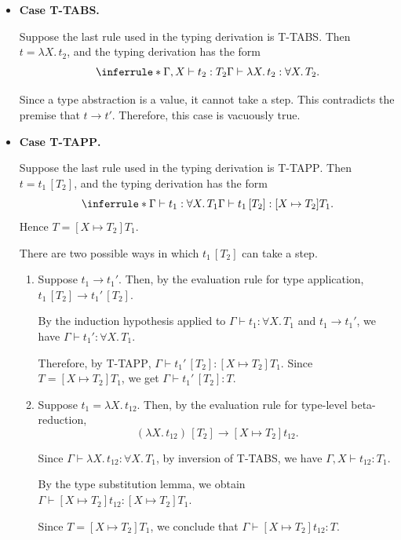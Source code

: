\documentclass[nonacm]{acmart}
\begin{document}
\begin{itemize}
    \item \textbf{Case \textsc{T-TABS}.}

    Suppose the last rule used in the typing derivation is \textsc{T-TABS}. Then $t = \lambda X.\,t_2$, and the typing derivation has the form
    \[
    \inferrule*
    {
      \Gamma, X \vdash t_2 : T_2
    }
    {
      \Gamma \vdash \lambda X.\,t_2 : \forall X.\,T_2
    }.
    \]

    Since a type abstraction is a value, it cannot take a step. This contradicts the premise that $t \longrightarrow t'$. Therefore, this case is vacuously true.

    \item \textbf{Case \textsc{T-TAPP}.}

    Suppose the last rule used in the typing derivation is \textsc{T-TAPP}. Then $t = t_1\,[T_2]$, and the typing derivation has the form
    \[
    \inferrule*
    {
      \Gamma \vdash t_1 : \forall X.\,T_1
    }
    {
      \Gamma \vdash t_1\,[T_2] : [X \mapsto T_2]T_1
    }.
    \]
    Hence $T = [X \mapsto T_2]T_1$.

    There are two possible ways in which $t_1\,[T_2]$ can take a step.

    \begin{enumerate}
        \item Suppose $t_1 \longrightarrow t_1'$. Then, by the evaluation rule for type application, $t_1\,[T_2] \longrightarrow t_1'\,[T_2]$.

        By the induction hypothesis applied to $\Gamma \vdash t_1 : \forall X.\,T_1$ and $t_1 \longrightarrow t_1'$, we have $\Gamma \vdash t_1' : \forall X.\,T_1$.

        Therefore, by \textsc{T-TAPP}, $\Gamma \vdash t_1'\,[T_2] : [X \mapsto T_2]T_1$. Since $T = [X \mapsto T_2]T_1$, we get $\Gamma \vdash t_1'\,[T_2] : T$.

        \item Suppose $t_1 = \lambda X.\,t_{12}$. Then, by the evaluation rule for type-level beta-reduction,
        \[
        (\lambda X.\,t_{12})\,[T_2]
        \longrightarrow
        [X \mapsto T_2]t_{12}.
        \]

        Since $\Gamma \vdash \lambda X.\,t_{12} : \forall X.\,T_1$, by inversion of \textsc{T-TABS}, we have $\Gamma, X \vdash t_{12} : T_1$.

        By the type substitution lemma, we obtain $\Gamma \vdash [X \mapsto T_2]t_{12} : [X \mapsto T_2]T_1$.

        Since $T = [X \mapsto T_2]T_1$, we conclude that $\Gamma \vdash [X \mapsto T_2]t_{12} : T$.
    \end{enumerate}
\end{itemize}
\end{document}
